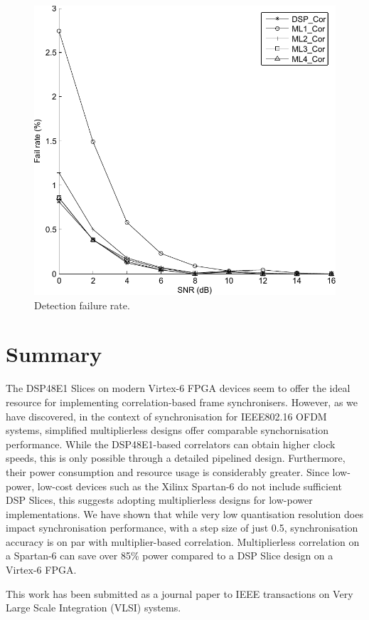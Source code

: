 \begin{figure}
	\centerline{\includegraphics [width=0.85\columnwidth] {figures/Plot_NFail.pdf} }
	\caption{Detection failure rate.}
	\label{fig:Plot_NFail}
\end{figure}

\section{Summary}
The DSP48E1 Slices on modern Virtex-6 FPGA devices seem to offer the ideal resource for implementing correlation-based frame synchronisers.
However, as we have discovered, in the context of synchronisation for IEEE802.16 OFDM systems, simplified multiplierless designs offer comparable synchornisation performance. 
While the DSP48E1-based correlators can obtain higher clock speeds, this is only possible through a detailed pipelined design.
Furthermore, their power consumption and resource usage is considerably greater.
Since low-power, low-cost devices such as the Xilinx Spartan-6 do not include sufficient DSP Slices, this suggests adopting multiplierless designs for low-power implementations.
We have shown that while very low quantisation resolution does impact synchronisation performance, with a step size of just 0.5, synchronisation accuracy is on par with multiplier-based correlation. 
Multiplierless correlation on a Spartan-6 can save over 85\% power compared to  a DSP Slice design on a Virtex-6 FPGA.

This work has been submitted as a journal paper to  IEEE transactions on Very Large Scale Integration (VLSI) systems.